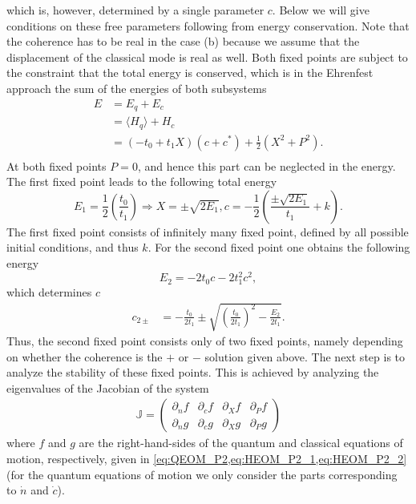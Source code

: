 \documentclass{article}
\begin{document}
which is, however, determined by a single parameter $c$. Below we will give conditions on these free parameters following from energy conservation.
Note that the coherence has to be real in the case (b) because we assume that the displacement of the classical mode is real as well.
Both fixed points are subject to the constraint that the total energy is conserved, which is in the Ehrenfest approach the sum of the energies of both subsystems
\begin{align}
	E &= E_q + E_c  \\
	 &= \langle H_q\rangle + H_c\\
	 &= (-t_0+t_1 X)(c+c^*) + \frac{1}{2}(X^2+P^2).\\
\end{align}
At both fixed points $P=0$, and hence this part can be neglected in the energy.
The first fixed point leads to the following total energy
\begin{equation}
	E_1 = \frac{1}{2}\left(\frac{t_0}{t_1}\right) \Rightarrow X = \pm\sqrt{2E_1} , c=-\frac{1}{2}\left(\frac{\pm\sqrt{2E_1}}{t_1}+k\right).  
\end{equation}
The first fixed point consists of infinitely many fixed point, defined by all possible initial conditions, and thus $k$. 
For the second fixed point one obtains the following energy
\begin{equation}
	E_2 = -2t_0c - 2t_1^2 c^2,
\end{equation}
which determines $c$ 
\begin{align}
	c_{2\pm} &= -\frac{t_0}{2t_1} \pm\sqrt{\left(\frac{t_0}{2t_1}\right)^2 - \frac{E_2}{2t_1}}.
\end{align}
Thus, the second fixed point consists only of two fixed points, namely depending on whether the coherence is the $+$ or $-$ solution given above. 
The next step is to analyze the stability of these fixed points. This is achieved by analyzing the eigenvalues of the Jacobian of the system 
\begin{align}
	\mathds{J} = \begin{pmatrix}
		\partial_n f & \partial_c f & \partial_X f & \partial_P f\\
		\partial_n g & \partial_c g & \partial_X g & \partial_P g
	\end{pmatrix}
\end{align}  
where $f$ and $g$ are the right-hand-sides of the quantum and classical equations of motion, respectively, given in \cref{eq:QEOM_P2,eq:HEOM_P2_1,eq:HEOM_P2_2} (for the quantum equations of motion we only consider the parts corresponding to $\dot{n}$ and $\dot{c}$).
\end{document}
